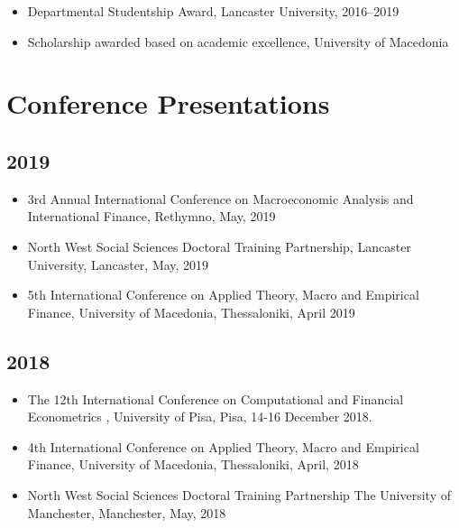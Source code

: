\documentclass[10pt,]{article}
\begin{document}
              \begin{itemize}
              \item
                Departmental Studentship Award, Lancaster University, 2016--2019
              \item
                Scholarship awarded based on academic excellence, University of
                Macedonia
              \end{itemize}
              
              \hypertarget{conference-presentations}{%
              \section{Conference Presentations}\label{conference-presentations}}
              
              \hypertarget{section}{%
              \subsection{2019}\label{section}}
              
              \begin{itemize}
              \item
                3rd Annual International Conference on Macroeconomic Analysis and
                International Finance, Rethymno, May, 2019
              \item
                North West Social Sciences Doctoral Training Partnership, Lancaster
                University, Lancaster, May, 2019
              \item
                5th International Conference on Applied Theory, Macro and Empirical
                Finance, University of Macedonia, Thessaloniki, April 2019
              \end{itemize}
              
              \hypertarget{section-1}{%
              \subsection{2018}\label{section-1}}
              
              \begin{itemize}
              \item
                The 12th International Conference on Computational and Financial
                Econometrics , University of Pisa, Pisa, 14-16 December 2018.
              \item
                4th International Conference on Applied Theory, Macro and Empirical
                Finance, University of Macedonia, Thessaloniki, April, 2018
              \item
                North West Social Sciences Doctoral Training Partnership The
                University of Manchester, Manchester, May, 2018
              \end{itemize}
              
\end{document}
